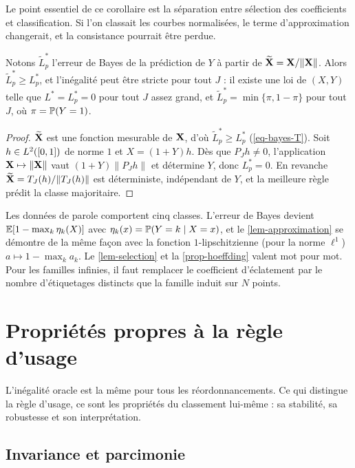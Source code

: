 Le point essentiel de ce corollaire est la séparation entre sélection des coefficients et classification. Si l'on classait les courbes normalisées, le terme d'approximation changerait, et la consistance pourrait être perdue.

\begin{proposition}\label{prop-normalisation-perte}
Notons $\tilde L^*_p$ l'erreur de Bayes de la prédiction de $Y$ à partir de $\widetilde{\mathbf{X}}=\mathbf{X}/\|\mathbf{X}\|$. Alors $\tilde L^*_p\ge L^*_p$, et l'inégalité peut être stricte pour tout $J$ : il existe une loi de $(X,Y)$ telle que $L^*=L^*_p=0$ pour tout $J$ assez grand, et $\tilde L^*_p=\min\{\pi,1-\pi\}$ pour tout $J$, où $\pi=\mathbb{P}(Y=1)$.
\end{proposition}

\begin{proof}
$\widetilde{\mathbf{X}}$ est une fonction mesurable de $\mathbf{X}$, d'où $\tilde L^*_p\ge L^*_p$ (\cref{eq-bayes-T}). Soit $h\in L^2([0,1])$ de norme $1$ et $X=(1+Y)h$. Dès que $P_Jh\neq0$, l'application $\mathbf{X}\mapsto\|\mathbf{X}\|$ vaut $(1+Y)\|P_Jh\|$ et détermine $Y$, donc $L^*_p=0$. En revanche $\widetilde{\mathbf{X}}=T_J(h)/\|T_J(h)\|$ est déterministe, indépendant de $Y$, et la meilleure règle prédit la classe majoritaire.
\end{proof}

\begin{remarque}\label{rem-multiclasse}
Les données de parole comportent cinq classes. L'erreur de Bayes devient $\mathbb{E}[1-\max_k\eta_k(X)]$ avec $\eta_k(x)=\mathbb{P}(Y=k\mid X=x)$, et le \cref{lem-approximation} se démontre de la même façon avec la fonction $1$-lipschitzienne (pour la norme $\ell^1$) $a\mapsto1-\max_ka_k$. Le \cref{lem-selection} et la \cref{prop-hoeffding} valent mot pour mot. Pour les familles infinies, il faut remplacer le coefficient d'éclatement par le nombre d'étiquetages distincts que la famille induit sur $N$ points.
\end{remarque}

\section{Propriétés propres à la règle d'usage}\label{sec-proprietes}

L'inégalité oracle est la même pour tous les réordonnancements. Ce qui distingue la règle d'usage, ce sont les propriétés du classement lui-même : sa stabilité, sa robustesse et son interprétation.

\subsection{Invariance et parcimonie}


